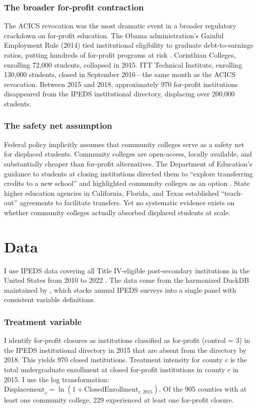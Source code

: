 \documentclass[12pt]{article}
\begin{document}
\subsubsection*{The broader for-profit contraction} The ACICS revocation was the most dramatic event in a broader regulatory crackdown on for-profit education. The Obama administration's Gainful Employment Rule (2014) tied institutional eligibility to graduate debt-to-earnings ratios, putting hundreds of for-profit programs at risk \citep{Cellini2020}. Corinthian Colleges, enrolling 72,000 students, collapsed in 2015. ITT Technical Institute, enrolling 130,000 students, closed in September 2016---the same month as the ACICS revocation. Between 2015 and 2018, approximately 970 for-profit institutions disappeared from the IPEDS institutional directory, displacing over 200,000 students.

\subsubsection*{The safety net assumption} Federal policy implicitly assumes that community colleges serve as a safety net for displaced students. Community colleges are open-access, locally available, and substantially cheaper than for-profit alternatives. The Department of Education's guidance to students at closing institutions directed them to ``explore transferring credits to a new school'' and highlighted community colleges as an option \citep{DoED2016b}. State higher education agencies in California, Florida, and Texas established ``teach-out'' agreements to facilitate transfers. Yet no systematic evidence exists on whether community colleges actually absorbed displaced students at scale.

\section{Data}

I use IPEDS data covering all Title IV-eligible post-secondary institutions in the United States from 2010 to 2022 \citep{NCES2024}. The data come from the harmonized DuckDB maintained by \citet{GoldsmithPinkham2024}, which stacks annual IPEDS surveys into a single panel with consistent variable definitions.

\subsubsection*{Treatment variable} I identify for-profit closures as institutions classified as for-profit (control = 3) in the IPEDS institutional directory in 2015 that are absent from the directory by 2018. This yields 970 closed institutions. Treatment intensity for county $c$ is the total undergraduate enrollment at closed for-profit institutions in county $c$ in 2015. I use the log transformation: $\text{Displacement}_c = \ln(1 + \text{ClosedEnrollment}_{c,2015})$. Of the 905 counties with at least one community college, 229 experienced at least one for-profit closure.
\end{document}
